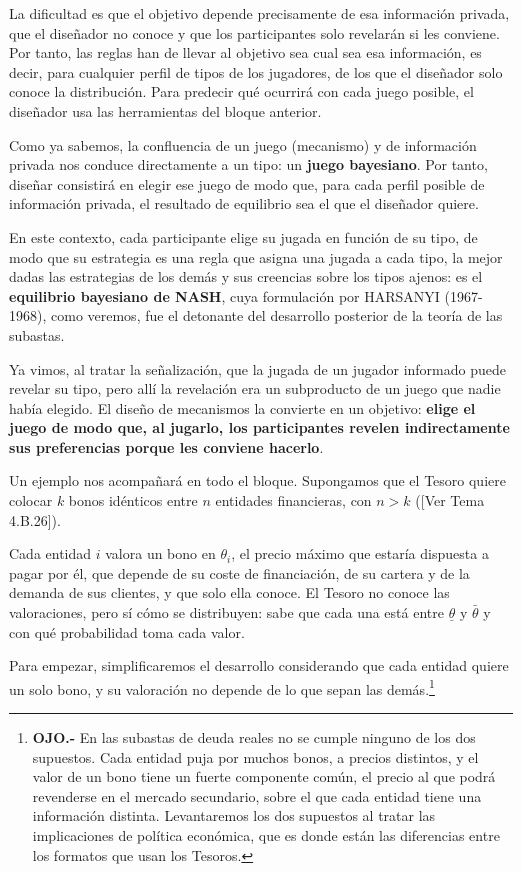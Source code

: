 \documentclass[10pt,a4paper]{article}
\newcommand{\authorfont}[1]{{\fontfamily{EBGaramond-TLF}\selectfont #1}}
\begin{document}
La dificultad es que el objetivo depende precisamente de esa información privada, que el diseñador no conoce y que los participantes solo revelarán si les conviene. Por tanto, las reglas han de llevar al objetivo sea cual sea esa información, es decir, para cualquier perfil de tipos de los jugadores, de los que el diseñador solo conoce la distribución. Para predecir qué ocurrirá con cada juego posible, el diseñador usa las herramientas del bloque anterior. 

Como ya sabemos, la confluencia de un juego (mecanismo) y de información privada nos conduce directamente a un tipo: un \textbf{juego bayesiano}. Por tanto, diseñar consistirá en elegir ese juego de modo que, para cada perfil posible de información privada, el resultado de equilibrio sea el que el diseñador quiere.

En este contexto, cada participante elige su jugada en función de su tipo, de modo que su estrategia es una regla que asigna una jugada a cada tipo, la mejor dadas las estrategias de los demás y sus creencias sobre los tipos ajenos: es el \textbf{equilibrio bayesiano de NASH}, cuya formulación por HARSANYI (1967-1968), como veremos, fue el detonante del desarrollo posterior de la teoría de las subastas. 

Ya vimos, al tratar la señalización, que la jugada de un jugador informado puede revelar su tipo, pero allí la revelación era un subproducto de un juego que nadie había elegido. El diseño de mecanismos la convierte en un objetivo: \textbf{elige el juego de modo que, al jugarlo, los participantes revelen indirectamente sus preferencias porque les conviene hacerlo}.

Un ejemplo nos acompañará en todo el bloque. Supongamos que el Tesoro quiere colocar $k$ bonos idénticos entre $n$ entidades financieras, con $n>k$ ([\authorfont{Ver Tema 4.B.26}]). 

Cada entidad $i$ valora un bono en $\theta_i$, el precio máximo que estaría dispuesta a pagar por él, que depende de su coste de financiación, de su cartera y de la demanda de sus clientes, y que solo ella conoce. El Tesoro no conoce las valoraciones, pero sí cómo se distribuyen: sabe que cada una está entre $\underline{\theta}$ y $\bar{\theta}$ y con qué probabilidad toma cada valor. 

Para empezar, simplificaremos el desarrollo considerando que cada entidad quiere un solo bono, y su valoración no depende de lo que sepan las demás.\footnote{%
  \textbf{OJO.-} En las subastas de deuda reales no se cumple ninguno de los dos supuestos. Cada entidad puja por muchos bonos, a precios distintos, y el valor de un bono tiene un fuerte componente común, el precio al que podrá revenderse en el mercado secundario, sobre el que cada entidad tiene una información distinta. Levantaremos los dos supuestos al tratar las implicaciones de política económica, que es donde están las diferencias entre los formatos que usan los Tesoros.
}
\end{document}
